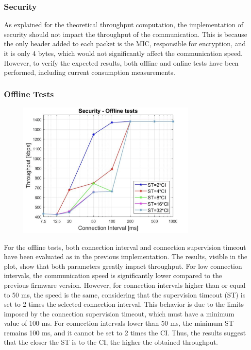 \documentclass{Configuration_Files/PoliMi3i_thesis}
\begin{document}
\subsubsection*{Security}

As explained for the theoretical throughput computation, the implementation of security should not impact the throughput of the communication. This is because the only header added to each packet is the MIC, responsible for encryption, and it is only 4 bytes, which would not significantly affect the communication speed. However, to verify the expected results, both offline and online tests have been performed, including current consumption measurements.

\subsubsection*{Offline Tests}

\begin{figure}[H]
    \centering
    \includegraphics[width=0.8\textwidth]{Results Manuel/figure9}
    \label{fig:figure1}
\end{figure}

For the offline tests, both connection interval and connection supervision timeout have been evaluated as in the previous implementation. The results, visible in the plot, show that both parameters greatly impact throughput. For low connection intervals, the communication speed is significantly lower compared to the previous firmware version. However, for connection intervals higher than or equal to 50 ms, the speed is the same, considering that the supervision timeout (ST) is set to 2 times the selected connection interval. This behavior is due to the limits imposed by the connection supervision timeout, which must have a minimum value of 100 ms. For connection intervals lower than 50 ms, the minimum ST remains 100 ms, and it cannot be set to 2 times the CI. Thus, the results suggest that the closer the ST is to the CI, the higher the obtained throughput.
\end{document}
